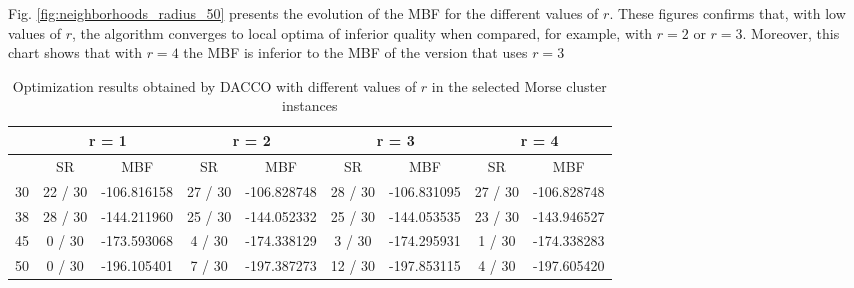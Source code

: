 		Fig. \ref{fig:neighborhoods_radius_50} presents the evolution of the MBF for the different values of $r$. These figures confirms that, with low values of $r$, the algorithm converges to local optima of inferior quality when compared, for example, with $r=2$ or $r=3$. Moreover, this chart shows that with $r=4$ the MBF is inferior to the MBF of the version that uses $r=3$
		
		
		
		
		\begin{landscape}
			 \begin{table}[!htdp]
					\begin{center}
						\begin{tabular}{| c | c | c | c | c | c | c | c | c |}
							\hline
							~ & \multicolumn{2}{c|}{\textbf{r = 1}} & \multicolumn{2}{c|}{\textbf{r = 2}} & \multicolumn{2}{c|}{\textbf{r = 3}} & \multicolumn{2}{c|}{\textbf{r = 4}} \\ \hline
							~ & SR & MBF & SR & MBF & SR & MBF & SR & MBF \\ \hline
							30 & 22 / 30 & -106.816158 & 27 / 30 & -106.828748 & 28 / 30 & -106.831095 & 27 / 30 & -106.828748 \\ \hline
							38 & 28 / 30 & -144.211960 & 25 / 30 & -144.052332 & 25 / 30 & -144.053535 & 23 / 30 & -143.946527 \\ \hline
							45 & 0 / 30 & -173.593068 & 4 / 30 & -174.338129 & 3 / 30 & -174.295931& 1 / 30 & -174.338283 \\ \hline
							50 & 0 / 30 & -196.105401 & 7 / 30 & -197.387273 & 12 / 30 & -197.853115 & 4 / 30 & -197.605420 \\ \hline
						\end{tabular}
						\caption{Optimization results obtained by DACCO with different values of $r$ in the selected Morse cluster instances}
						\label{tab:neighborhood_radius_results}
					\end{center}
			\end{table}
		

\end{landscape}
